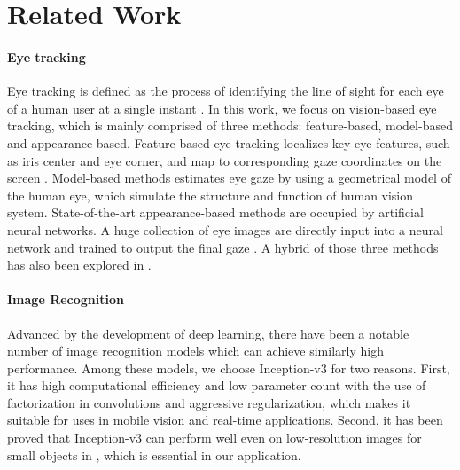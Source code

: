 \section{Related Work}

\paragraph{Eye tracking} Eye tracking is defined as the process of identifying the line of sight for each eye of a human user at a single instant \cite{kim2019nvgaze}. In this work, we focus on vision-based eye tracking, which is mainly comprised of three methods: feature-based, model-based and appearance-based. Feature-based eye tracking localizes key eye features, such as iris center and eye corner, and map to corresponding gaze coordinates on the screen \cite{sesma2012evaluation, torricelli2008neural}. Model-based methods \cite{wood20163d, wang2017real} estimates eye gaze by using a geometrical model of the human eye, which simulate the structure and function of human vision system. State-of-the-art appearance-based methods are occupied by artificial neural networks. A huge collection of eye images are directly input into a neural network and trained to output the final gaze \cite{zhang2015appearance, schneider2014manifold, sugano2014learning}. A hybrid of those three methods has also been explored in \cite{kim2019nvgaze, wang2018hierarchical}. 

\paragraph{Image Recognition}
Advanced by the development of deep learning, there have been a notable number of image recognition models
\cite{simonyan2014very, szegedy2015going, szegedy2016rethinking, he2016deep, szegedy2017inception} which can achieve similarly high performance. Among these models, we choose Inception-v3 \cite{szegedy2016rethinking} for two reasons. First, it has high computational efficiency and low parameter count with the use of factorization in convolutions and aggressive regularization, which makes it suitable for uses in mobile vision and real-time applications. Second, it has been proved that Inception-v3 can perform well even on low-resolution images for small objects in \cite{szegedy2016rethinking}, which is essential in our application.

